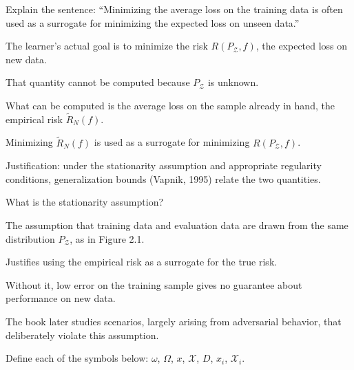 \documentclass[10pt]{extarticle}
\newcommand{\resposta}[1]{\par\smallskip\noindent #1}
\begin{document}
\begin{questoes}
\item Explain the sentence: ``Minimizing the average loss on the training data is often used as a surrogate for minimizing the expected loss on unseen data.''

\resposta{
\begin{topicos}
\item The learner's actual goal is to minimize the risk $R(P_{\mathcal{Z}}, f)$, the expected loss on new data.
\item That quantity cannot be computed because $P_{\mathcal{Z}}$ is unknown.
\item What can be computed is the average loss on the sample already in hand, the empirical risk $\tilde{R}_N(f)$.
\item Minimizing $\tilde{R}_N(f)$ is used as a surrogate for minimizing $R(P_{\mathcal{Z}}, f)$.
\item Justification: under the stationarity assumption and appropriate regularity conditions, generalization bounds (Vapnik, 1995) relate the two quantities.
\end{topicos}
}

\item What is the stationarity assumption?

\resposta{
\begin{topicos}
\item The assumption that training data and evaluation data are drawn from the same distribution $P_{\mathcal{Z}}$, as in Figure 2.1.
\item Justifies using the empirical risk as a surrogate for the true risk.
\item Without it, low error on the training sample gives no guarantee about performance on new data.
\item The book later studies scenarios, largely arising from adversarial behavior, that deliberately violate this assumption.
\end{topicos}
}

\item Define each of the symbols below: $\omega$, $\Omega$, $x$, $\mathcal{X}$, $D$, $x_i$, $\mathcal{X}_i$.


\end{questoes}
\end{document}
